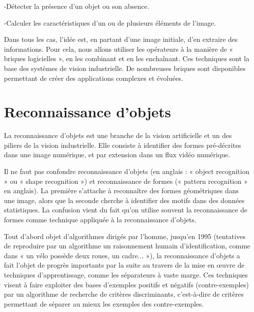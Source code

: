 \documentclass[11pt]{report}
\begin{document}
-Détecter la présence d'un objet ou son absence.

-Calculer les caractéristiques d'un ou de plusieurs éléments de l'image.

Dans tous les cas, l'idée est, en partant d'une image initiale, d'en extraire des
informations. Pour cela, nous allons utiliser les opérateurs à la manière de « briques
logicielles », en les combinant et en les enchaînant. Ces techniques sont la base des
systèmes de vision industrielle.
De nombreuses briques sont disponibles permettant de créer des applications
complexes et évoluées.
\section{Reconnaissance d'objets}
La reconnaissance d'objets est une branche de la vision artificielle et un des piliers
de la vision industrielle. Elle consiste à identifier des formes pré-décrites dans une image
numérique, et par extension dans un flux vidéo numérique.

Il ne faut pas confondre reconnaissance d'objets (en anglais : « object recognition »
ou « shape recognition ») et reconnaissance de formes (« pattern recognition » en anglais).
La première s'attache à reconnaître des formes géométriques dans une image, alors que la
seconde cherche à identifier des motifs dans des données statistiques. La confusion vient du
fait qu'on utilise souvent la reconnaissance de formes comme technique appliquée à la
reconnaissance d'objets.

Tout d'abord objet d'algorithmes dirigés par l'homme, jusqu'en 1995 (tentatives de
reproduire par un algorithme un raisonnement humain d'identification, comme dans « un
vélo possède deux roues, un cadre... »), la reconnaissance d'objets a fait l'objet de progrès
importants par la suite au travers de la mise en œuvre de techniques d'apprentissage,
comme les séparateurs à vaste marge. Ces techniques visent à faire exploiter des bases
d'exemples positifs et négatifs (contre-exemples) par un algorithme de recherche de critères
discriminants, c'est-à-dire de critères permettant de séparer au mieux les exemples des
contre-exemples.
\end{document}
